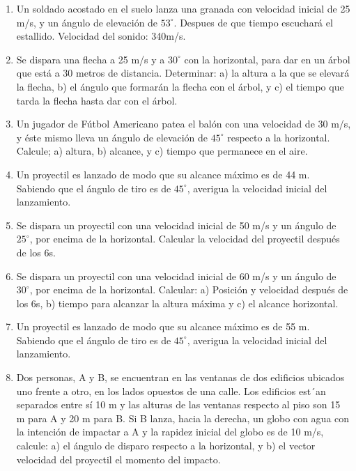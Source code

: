 \begin{enumerate}

 \item Un soldado acostado en el suelo lanza una granada con velocidad inicial de 25 m/s, y un ángulo de elevación de
 $53^\circ$. Despues de que tiempo escuchará el estallido. Velocidad del sonido: 340m/s.
 
 \item Se dispara una flecha a 25 m/s y a $30^\circ$ con la horizontal,
 para dar en un árbol que está a 30 metros de distancia. 
Determinar: a) la altura a la que se elevará
 la flecha,  b) el ángulo que formarán la
 flecha con el árbol, y c) el tiempo que 
tarda la flecha hasta dar con el árbol. 


\item Un jugador de Fútbol Americano patea el balón con una velocidad de 30 m/s, y éste mismo
 lleva un ángulo de elevación de 
$45^\circ
$ respecto a la horizontal. Calcule; a) altura, b) alcance, y c) tiempo que
 permanece en el aire.

\item  Un proyectil es lanzado de modo que su alcance máximo
 es de 44 m. Sabiendo que el ángulo de tiro es de $45^\circ$, 
averigua la velocidad inicial del
 lanzamiento. 

\item Se dispara un proyectil con una velocidad inicial de 50 m/s
 y un ángulo de $25^\circ$, por encima de la horizontal. 
Calcular la velocidad del proyectil después de
 los 6s.

\item Se dispara un proyectil con una velocidad inicial de 60 m/s y un ángulo de $30^\circ
$, por encima de
 la horizontal. 
Calcular: a) Posición y velocidad después de los 6s, b) tiempo para alcanzar la altura máxima
 y c) el  alcance horizontal.

\item  Un proyectil es lanzado de modo que su alcance máximo
 es de 55 m. Sabiendo que el ángulo de tiro es de $45^\circ$, 
averigua la velocidad inicial del
 lanzamiento. 

\item Dos personas, A y B, se encuentran en las ventanas de dos edificios ubicados uno frente a
 otro, en los lados opuestos de 
una calle. Los edificios est´an separados entre sí 10 m y las alturas de las
 ventanas respecto al piso son 15 m para A y 20 m 
para B. Si B lanza, hacia la derecha, un globo con agua
 con la intención de impactar a A y la rapidez inicial del globo es de 
10 m/s, calcule: a) el ángulo de disparo
 respecto a la horizontal, y b) el vector velocidad del proyectil el momento del impacto.

\end{enumerate}
